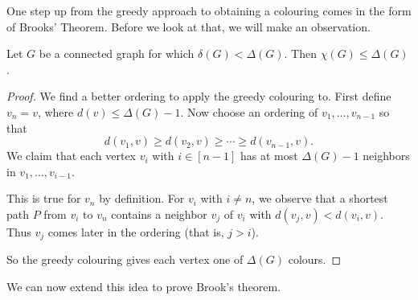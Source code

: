 One step up from the greedy approach to obtaining a colouring comes in the form of Brooks' Theorem. Before we look at that, we will make an observation.

\begin{proposition}
	Let $G$ be a connected graph for which $\delta(G) < \Delta(G)$. Then $\chi(G) \leq \Delta(G)$.
\end{proposition}
\begin{proof}
	We find a better ordering to apply the greedy colouring to. First define $v_n = v$, where $d(v) \leq \Delta(G) - 1$. Now choose an ordering of $v_1, \dots, v_{n - 1}$ so that
	$$
	d(v_1, v) \geq d(v_2, v) \geq \cdots \geq d(v_{n - 1}, v).
	$$
	We claim that each vertex $v_i$ with $i \in [n - 1]$ has at most $\Delta(G) - 1$ neighbors in $v_1, \dots, v_{i - 1}$.

	This is true for $v_n$ by definition. For $v_i$ with $i \neq n$, we observe that a shortest path $P$ from $v_i$ to $v_n$ contains a neighbor $v_j$ of $v_i$ with $d(v_j, v) < d(v_i, v)$. Thus $v_j$ comes later in the ordering (that is, $j > i$).

	So the greedy colouring gives each vertex one of $\Delta(G)$ colours.
\end{proof}

We can now extend this idea to prove Brook's theorem.

